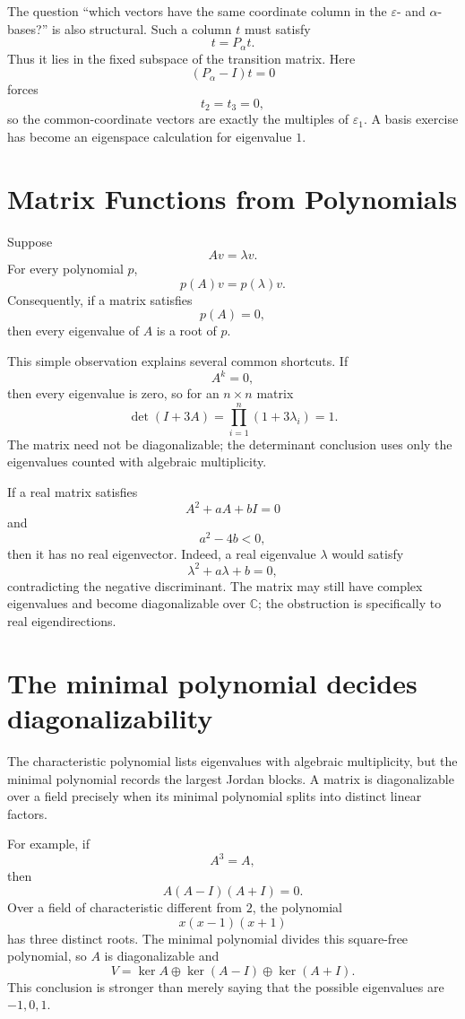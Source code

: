 The question “which vectors have the same coordinate column in the \(\varepsilon\)- and \(\alpha\)-bases?” is also structural.  Such a column \(t\) must satisfy
\[
  t=P_\alpha t.
\]
Thus it lies in the fixed subspace of the transition matrix.  Here
\[
  (P_\alpha-I)t=0
\]
forces
\[
  t_2=t_3=0,
\]
so the common-coordinate vectors are exactly the multiples of \(\varepsilon_1\).  A basis exercise has become an eigenspace calculation for eigenvalue \(1\).

\section{Matrix Functions from Polynomials}

Suppose
\[
  Av=\lambda v.
\]
For every polynomial \(p\),
\[
  p(A)v=p(\lambda)v.
\]
Consequently, if a matrix satisfies
\[
  p(A)=0,
\]
then every eigenvalue of \(A\) is a root of \(p\).

This simple observation explains several common shortcuts.  If
\[
  A^k=0,
\]
then every eigenvalue is zero, so for an \(n\times n\) matrix
\[
  \det(I+3A)
  =\prod_{i=1}^n(1+3\lambda_i)=1.
\]
The matrix need not be diagonalizable; the determinant conclusion uses only the eigenvalues counted with algebraic multiplicity.

If a real matrix satisfies
\[
  A^2+aA+bI=0
\]
and
\[
  a^2-4b<0,
\]
then it has no real eigenvector.  Indeed, a real eigenvalue \(\lambda\) would satisfy
\[
  \lambda^2+a\lambda+b=0,
\]
contradicting the negative discriminant.  The matrix may still have complex eigenvalues and become diagonalizable over \(\mathbb C\); the obstruction is specifically to real eigendirections.

\section{The minimal polynomial decides diagonalizability}

The characteristic polynomial lists eigenvalues with algebraic multiplicity, but the minimal polynomial records the largest Jordan blocks.  A matrix is diagonalizable over a field precisely when its minimal polynomial splits into distinct linear factors.

For example, if
\[
  A^3=A,
\]
then
\[
  A(A-I)(A+I)=0.
\]
Over a field of characteristic different from \(2\), the polynomial
\[
  x(x-1)(x+1)
\]
has three distinct roots.  The minimal polynomial divides this square-free polynomial, so \(A\) is diagonalizable and
\[
  V=\ker A\oplus\ker(A-I)\oplus\ker(A+I).
\]
This conclusion is stronger than merely saying that the possible eigenvalues are \(-1,0,1\).


